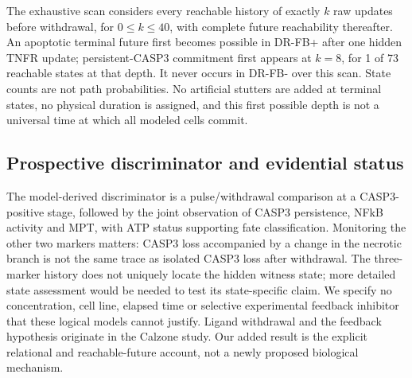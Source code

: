 \documentclass{ws-jbcb}
\numberwithin{equation}{section}
\newcommand{\DRDepth}{8}
\newcommand{\DRDepthStates}{73}
\newcommand{\DRFirstCommitted}{1}
\begin{document}
The exhaustive scan considers every reachable history of exactly $k$ raw
updates before withdrawal, for $0\leq k\leq40$, with complete future
reachability thereafter. An apoptotic terminal future first becomes possible
in DR-FB+ after one hidden TNFR update; persistent-CASP3 commitment first appears
at $k=\DRDepth{}$, for \DRFirstCommitted{} of \DRDepthStates{} reachable
states at that depth. It never occurs in DR-FB- over this scan. State counts
are not path probabilities. No artificial stutters are added at terminal
states, no physical duration is assigned, and this first possible depth is
not a universal time at which all modeled cells commit.

\subsection{Prospective discriminator and evidential status}

The model-derived discriminator is a pulse/withdrawal comparison at a
CASP3-positive stage, followed by the joint observation of CASP3 persistence,
NFkB activity and MPT, with ATP status supporting fate classification.
Monitoring the other two markers matters: CASP3 loss accompanied by a change
in the necrotic branch is not the same trace as isolated CASP3 loss after
withdrawal. The three-marker history does not uniquely locate the hidden
witness state; more detailed state assessment would be needed to test its
state-specific claim. We specify no concentration, cell line, elapsed time or
selective experimental feedback inhibitor that these logical models cannot
justify. Ligand withdrawal and the feedback hypothesis originate in the
Calzone study.\cite{Calzone2010} Our added result is the explicit relational
and reachable-future account, not a newly proposed biological mechanism.
\end{document}
